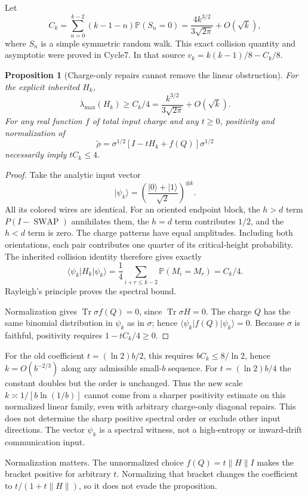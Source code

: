 \documentclass[11pt]{article}
\newtheorem{proposition}[theorem]{Proposition}
\newcommand{\Tr}{\operatorname{Tr}}
\newcommand{\ket}[1]{\lvert #1\rangle}
\newcommand{\bra}[1]{\langle #1\rvert}
\newcommand{\norm}[1]{\lVert #1\rVert}
\newcommand{\Prob}{\mathbb P}
\newcommand{\SWAP}{\operatorname{SWAP}}
\begin{document}
Let
\[
 C_k=\sum_{n=0}^{k-2}(k-1-n)\Prob(S_n=0)
     =\frac{4k^{3/2}}{3\sqrt{2\pi}}+O(\sqrt k),
\]
where \(S_n\) is a simple symmetric random walk. This exact collision
quantity and asymptotic were proved in Cycle7. In that source
\(v_k=k(k-1)/8-C_k/8\).

\begin{proposition}[Charge-only repairs cannot remove the linear obstruction]
\label{prop:obstruction}
For the explicit inherited \(H_k\),
\[
 \lambda_{\max}(H_k)\ge C_k/4
       =\frac{k^{3/2}}{3\sqrt{2\pi}}+O(\sqrt k).
\]
For any real function \(f\) of total input charge and any \(t\ge0\),
positivity and normalization of
\[
 \widetilde\rho=\sigma^{1/2}[I-tH_k+f(Q)]\sigma^{1/2}
\]
necessarily imply \(tC_k\le4\).
\end{proposition}
\begin{proof}
Take the analytic input vector
\[
 \ket{\psi_k}=\left(\frac{\ket0+\ket1}{\sqrt2}\right)^{\otimes k}.
\]
All its colored wires are identical. For an oriented endpoint block,
the \(h>d\) term \(P(I-\SWAP)\) annihilates them, the \(h=d\)
term contributes \(1/2\), and the \(h<d\) term is zero.
The charge patterns have equal amplitudes. Including both orientations,
each pair contributes one quarter of its critical-height probability.
The inherited collision identity therefore gives exactly
\[
 \bra{\psi_k}H_k\ket{\psi_k}
 =\frac14\sum_{i+r\le k-2}\Prob(M_i=M_r)=C_k/4.
\]
Rayleigh's principle proves the spectral bound.

Normalization gives \(\Tr\sigma f(Q)=0\), since \(\Tr\sigma H=0\).
The charge \(Q\) has the same binomial distribution in \(\psi_k\) as
in \(\sigma\); hence \(\bra{\psi_k}f(Q)\ket{\psi_k}=0\).
Because \(\sigma\) is faithful, positivity requires
\(1-tC_k/4\ge0\).
\end{proof}

For the old coefficient \(t=(\ln2)b/2\), this requires
\(bC_k\le8/\ln2\), hence \(k=O(b^{-2/3})\) along any admissible
small-\(b\) sequence. For \(t=(\ln2)b/4\) the constant doubles but the
order is unchanged. Thus the new scale \(k\asymp1/[b\ln(1/b)]\) cannot
come from a sharper positivity estimate on this normalized linear family,
even with arbitrary charge-only diagonal repairs.
This does not determine the sharp positive spectral order or exclude
other input directions. The vector \(\psi_k\) is a spectral witness, not
a high-entropy or inward-drift communication input.

Normalization matters. The unnormalized choice
\(f(Q)=t\norm H I\) makes the bracket positive for arbitrary \(t\).
Normalizing that bracket changes the coefficient to
\(t/(1+t\norm H)\), so it does not evade the proposition.
\end{document}
